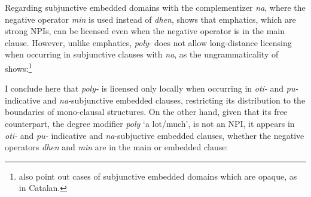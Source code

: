 \documentclass[output=paper]{langscibook}
\begin{document}
\noindent Regarding subjunctive embedded domains with the complementizer \textit{na}, where the negative operator \textit{min} is used instead of \textit{dhen}, \citet{giannaki1997dissert, giannaki1998} shows that emphatics, which are strong NPIs, can be licensed even when the negative operator is in the main clause. However, unlike emphatics, \textit{poly}- does not allow long-distance licensing when occurring in subjunctive clauses with \textit{na}, as the ungrammaticality of  shows:\footnote{\citet{giannakiquer1997} also point out cases of subjunctive embedded domains which are opaque, as in Catalan.}

\begin{exe}
\ex\label{gia:ex20} \begin{xlist}
        \label{gia:ex20b}
    \end{xlist}
\end{exe}

\noindent I conclude here that \textit{poly-} is licensed only locally when occurring in \textit{oti-} and \textit{pu-}indicative and \textit{na-}subjunctive embedded clauses, restricting its distribution to the boundaries of mono-clausal structures. On the other hand, given that its free counterpart, the degree modifier \textit{poly} `a lot/much', is not an NPI, it appears in \textit{oti-}  and \textit{pu-} indicative and \textit{na}-subjuctive embedded clauses, whether the negative operators \textit{dhen} and \textit{min} are in the main or embedded clause:
\end{document}
